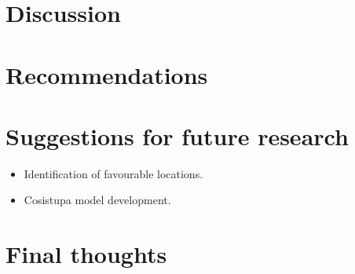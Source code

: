 \section{Discussion}

\section{Recommendations}

\section{Suggestions for future research}

\begin{itemize} 

\item Identification of favourable locations.

\item Cosistupa model development.

\end{itemize}

\section{Final thoughts}






